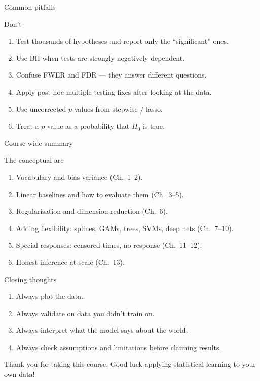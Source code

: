\documentclass[aspectratio=169,11pt]{beamer}
\begin{document}
\begin{frame}{Common pitfalls}
  \begin{alertblock}{Don't}
    \begin{enumerate}
      \item Test thousands of hypotheses and report only the
            ``significant'' ones.
      \item Use BH when tests are strongly negatively dependent.
      \item Confuse FWER and FDR --- they answer different questions.
      \item Apply post-hoc multiple-testing fixes after looking at
            the data.
      \item Use uncorrected $p$-values from stepwise / lasso.
      \item Treat a $p$-value as a probability that $H_0$ is true.
    \end{enumerate}
  \end{alertblock}
\end{frame}

\begin{frame}{Course-wide summary}
  \begin{block}{The conceptual arc}
    \begin{enumerate}
      \item Vocabulary and bias-variance (Ch.~1--2).
      \item Linear baselines and how to evaluate them (Ch.~3--5).
      \item Regularisation and dimension reduction (Ch.~6).
      \item Adding flexibility: splines, GAMs, trees, SVMs, deep nets
            (Ch.~7--10).
      \item Special responses: censored times, no response
            (Ch.~11--12).
      \item Honest inference at scale (Ch.~13).
    \end{enumerate}
  \end{block}
\end{frame}

\begin{frame}{Closing thoughts}
  \begin{takeaway}
    \begin{enumerate}
      \item Always plot the data.
      \item Always validate on data you didn't train on.
      \item Always interpret what the model says about the world.
      \item Always check assumptions and limitations before claiming
            results.
    \end{enumerate}
  \end{takeaway}
  Thank you for taking this course. Good luck applying statistical
  learning to your own data!
\end{frame}
\end{document}
